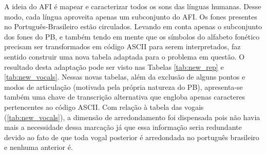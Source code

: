 A ideia do AFI é mapear e caracterizar todos os sons das línguas humanas. Desse modo, cada língua aproveita apenas um subconjunto do AFI. Os fones presentes no Português-Brasileiro estão circulados. Levando em conta apenas o subconjunto dos fones do PB, e também tendo em mente que os símbolos do alfabeto fonético precisam ser transformados em código ASCII para serem interpretados, faz sentido construir uma nova tabela adaptada para o problema em questão. O resultado desta adaptação pode ser visto nas Tabelas \ref{tab:new_rep} e \ref{tab:new_vocals}. Nessas novas tabelas, além da exclusão de alguns pontos e modos de articulação (motivada pela própria natureza do PB), apresenta-se também uma chave de transcrição alternativa que engloba apenas caracteres pertencentes ao código ASCII. Com relação à tabela das vogais (\ref{tab:new_vocals}), a dimensão de arredondamento foi dispensada pois não havia mais a necessidade dessa marcação já que essa informação seria redundante devido ao fato de que toda vogal posterior é arredondada no português brasileiro e nenhuma anterior é.

